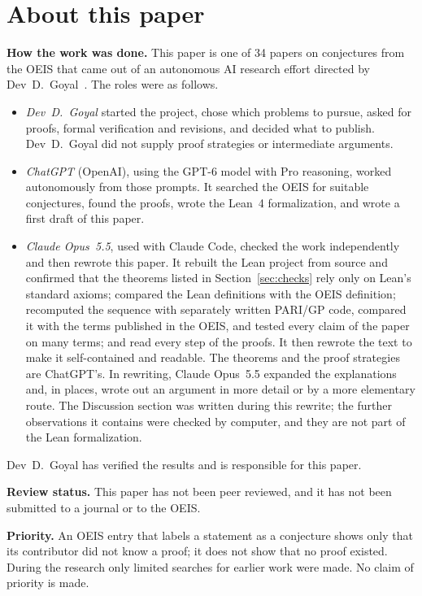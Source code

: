 \documentclass[11pt,a4paper]{article}
\theoremstyle{definition}
\theoremstyle{remark}
\newcommand{\para}[1]{\par\medskip\noindent\textbf{#1}\enspace}
\begin{document}
\section*{About this paper}\label{sec:about}
\para{How the work was done.}
This paper is one of 34 papers on conjectures from the OEIS that came out of an autonomous AI research effort directed
by Dev~D.~Goyal~\cite{repo}. The roles were as follows.
\begin{itemize}
\item \emph{Dev~D.~Goyal} started the project, chose which problems to pursue, asked for proofs, formal verification and
revisions, and decided what to publish. Dev~D.~Goyal did not supply proof strategies or intermediate arguments.
\item \emph{ChatGPT} (OpenAI), using the GPT-6 model with Pro reasoning, worked autonomously from those prompts. It
searched the OEIS for suitable conjectures, found the proofs, wrote the Lean~4 formalization, and wrote a first draft
of this paper.
\item \emph{Claude Opus~5.5}, used with Claude Code, checked the work independently and then rewrote this paper. It
rebuilt the Lean project from source and confirmed that the theorems listed in Section~\ref{sec:checks} rely only on
Lean's standard axioms; compared the Lean definitions with the OEIS definition; recomputed the sequence with separately
written PARI/GP code, compared it with the terms published in the OEIS, and tested every claim of the paper on many
terms; and read every step of the proofs. It then rewrote the text to make it self-contained and readable. The
theorems and the proof strategies are ChatGPT's. In rewriting, Claude Opus~5.5 expanded the explanations and, in
places, wrote out an argument in more detail or by a more elementary route. The Discussion section was written during
this rewrite; the further observations it contains were checked by computer, and they are not part of the Lean
formalization.
\end{itemize}
Dev~D.~Goyal has verified the results and is responsible for this paper.

\para{Review status.} This paper has not been peer reviewed, and it has not been submitted to a journal or to the OEIS.

\para{Priority.} An OEIS entry that labels a statement as a conjecture shows only that its contributor did not know
a proof; it does not show that no proof existed. During the research only limited searches for earlier work were
made. No claim of priority is made.
\end{document}
